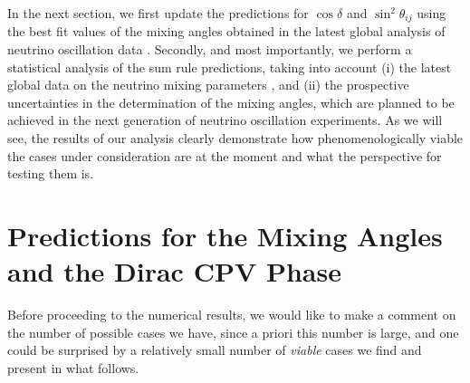 \documentclass[11pt,a4paper]{article}
\def\th{\theta}
\numberwithin{equation}{section}
\begin{document}
In the next section, we first update the predictions
for $\cos\delta$ and $\sin^2\th_{ij}$ 
using the best fit values of the mixing angles obtained
in the latest global analysis 
of neutrino oscillation data \cite{NuFITv32Jan2018}.
Secondly, and most importantly, we perform a statistical
analysis of the sum rule predictions, taking into account 
(i) the latest global data on the neutrino mixing
parameters \cite{NuFITv32Jan2018}, 
and (ii) the prospective uncertainties in the determination
of the mixing angles, which are planned to be achieved in the
next generation of neutrino oscillation experiments.
As we will see, the results of our analysis clearly demonstrate how 
phenomenologically viable the cases under consideration 
are at the moment and what the perspective for testing them is.

 
\section{Predictions for the Mixing Angles and the Dirac CPV Phase}
\label{sec:predictions}

 Before proceeding to the numerical results, we would like to make a comment on 
the number of possible cases we have, since a priori this number is large,  
and one could be surprised by a relatively small number of
\textit{viable} cases we find and present in what follows.
\end{document}
